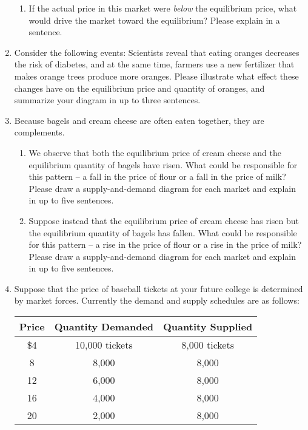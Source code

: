\documentclass{article}
\begin{document}
\begin{enumerate}
\begin{enumerate}
	\item If the actual price in this market were \textit{below} the equilibrium price, what would drive the market toward the equilibrium? Please explain in a sentence.
	
	\end{enumerate}

\item Consider the following events: Scientists reveal that eating oranges decreases the risk of diabetes, and at the same time, farmers use a new fertilizer that makes orange trees produce more oranges. Please illustrate what effect these changes have on the equilibrium price and quantity of oranges, and summarize your diagram in up to three sentences.

\item Because bagels and cream cheese are often eaten together, they are complements.

	\begin{enumerate}
	
	\item We observe that both the equilibrium price of cream cheese and the equilibrium quantity of bagels have risen. What could be responsible for this pattern -- a fall in the price of flour or a fall in the price of milk? Please draw a supply-and-demand diagram for each market and explain in up to five sentences.
	
	\item Suppose instead that the equilibrium price of cream cheese has risen but the equilibrium quantity of bagels has fallen. What could be responsible for this pattern -- a rise in the price of flour or a rise in the price of milk? Please draw a supply-and-demand diagram for each market and explain in up to five sentences.
	
	\end{enumerate}
	
\item Suppose that the price of baseball tickets at your future college is determined by market forces. Currently the demand and supply schedules are as follows:

	\begin{center}
	\begin{tabular}{c c c}
	\textbf{Price} & \textbf{Quantity Demanded} & \textbf{Quantity Supplied} \\
	\hline
	\$4 & 10,000 tickets & 8,000 tickets \\
	8 & 8,000 & 8,000 \\
	12 & 6,000 & 8,000 \\
	16 & 4,000 & 8,000 \\
	20 & 2,000 & 8,000
	\end{tabular}
	\end{center}
	

\end{enumerate}
\end{document}
